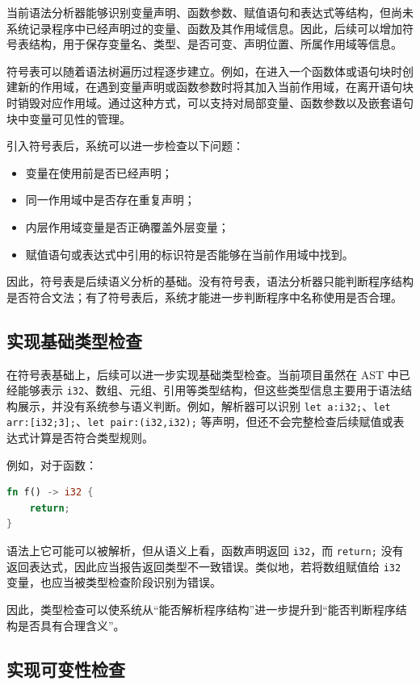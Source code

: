 \documentclass[UTF8,a4paper,12pt]{ctexart}
\begin{document}
当前语法分析器能够识别变量声明、函数参数、赋值语句和表达式等结构，但尚未系统记录程序中已经声明过的变量、函数及其作用域信息。因此，后续可以增加符号表结构，用于保存变量名、类型、是否可变、声明位置、所属作用域等信息。

符号表可以随着语法树遍历过程逐步建立。例如，在进入一个函数体或语句块时创建新的作用域，在遇到变量声明或函数参数时将其加入当前作用域，在离开语句块时销毁对应作用域。通过这种方式，可以支持对局部变量、函数参数以及嵌套语句块中变量可见性的管理。

引入符号表后，系统可以进一步检查以下问题：

\begin{itemize}
    \item 变量在使用前是否已经声明；
    \item 同一作用域中是否存在重复声明；
    \item 内层作用域变量是否正确覆盖外层变量；
    \item 赋值语句或表达式中引用的标识符是否能够在当前作用域中找到。
\end{itemize}

因此，符号表是后续语义分析的基础。没有符号表，语法分析器只能判断程序结构是否符合文法；有了符号表后，系统才能进一步判断程序中名称使用是否合理。

\subsection{实现基础类型检查}

在符号表基础上，后续可以进一步实现基础类型检查。当前项目虽然在 AST 中已经能够表示 \texttt{i32}、数组、元组、引用等类型结构，但这些类型信息主要用于语法结构展示，并没有系统参与语义判断。例如，解析器可以识别 \texttt{let a:i32;}、\texttt{let arr:[i32;3];}、\texttt{let pair:(i32,i32);} 等声明，但还不会完整检查后续赋值或表达式计算是否符合类型规则。


例如，对于函数：

\begin{lstlisting}[language=Rust,caption={返回类型检查示例}]
fn f() -> i32 {
    return;
}
\end{lstlisting}

语法上它可能可以被解析，但从语义上看，函数声明返回 \texttt{i32}，而 \texttt{return;} 没有返回表达式，因此应当报告返回类型不一致错误。类似地，若将数组赋值给 \texttt{i32} 变量，也应当被类型检查阶段识别为错误。

因此，类型检查可以使系统从“能否解析程序结构”进一步提升到“能否判断程序结构是否具有合理含义”。

\subsection{实现可变性检查}
\end{document}
